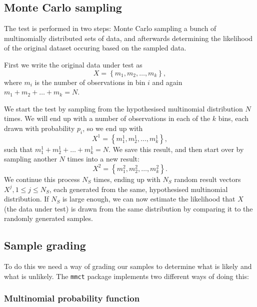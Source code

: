 \documentclass{ol-softwaremanual}
\newcommand{\mmct}{\texttt{mmct}}
\begin{document}
\subsection{Monte Carlo sampling}

The test is performed in two steps: Monte Carlo sampling a bunch of 
multinomially distributed sets of data, and afterwards determining the 
likelihood of the original dataset occuring based on the sampled data.

First we write the original data under test as
\begin{equation}
X = \left\{ m_1, m_2, \ldots , m_k \right\},
\end{equation}
where $m_i$ is the number of observations in bin $i$ and again 
$m_1+m_2+\ldots+m_k = N$.

We start the test by sampling from the hypothesised multinomial distribution 
$N$ times. 
We will end up with a number of observations in each of the $k$ bins, each 
drawn with probability $p_i$, so we end up with
\begin{equation}
X^1 = \left\{ m^1_1, m^1_2, \ldots , m^1_k \right\},
\end{equation}
such that $m^1_1 + m^1_2 + \ldots + m^1_k = N$. We save this result, and then 
start over by sampling another $N$ times into a new result:
\begin{equation}
X^2 = \left\{ m^2_1, m^2_2, \ldots , m^2_k \right\}.
\end{equation}
We continue this process $N_S$ times, ending up with $N_S$ random result 
vectors $X^j, 1\leq j \leq N_S$, each generated from the same, hypothesised 
multinomial distribution. If 
$N_S$ is large enough, we can now estimate the likelihood that $X$ (the data 
under test) is drawn 
from the same distribution by comparing it to the randomly generated samples.

\subsection{Sample grading}

To do this we need a way of grading our samples to determine what is likely and 
what is unlikely. The \mmct{} package implements two different ways of doing 
this:

\subsubsection{Multinomial probability function}
\end{document}
